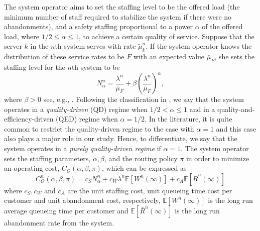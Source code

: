 \documentclass[a4paper,11pt,twoside]{article}
\numberwithin{equation}{section}
\numberwithin{figure}{section}
\theoremstyle{plain}
\newcommand{\EE}{\mathbb{E}}
\newcommand{\1}{\mathbbm{1}}
\begin{document}
The system operator aims to set the staffing level to be the offered load (the minimum number of staff required to stabilize the system if there were no abandonments), and a  safety staffing proportional to a power $\alpha$ of the offered load, where $1/2\leq \alpha\leq 1$, to achieve a certain quality of service. Suppose that the server $k$ in the $n$th system serves with rate $\tilde{\mu}_k^n$. If the system operator knows the distribution of these service rates to be $F$ with an expected value $\bar{\mu}_F$, she sets the staffing level for the $n$th system to be
\begin{equation}
    N_\alpha^n=\frac{\lambda^n}{\bar{\mu}_F}+\beta\left(\frac{\lambda^n}{\bar{\mu}_F}\right)^{\alpha},
    \label{eq:staffing_level}
\end{equation}
where $\beta>0$ see, e.g., \cite{Gans2003}. Following the classification in \cite{garnettetal02}, we say that the system operates in a \textit{quality-driven} (QD) regime when $1/2<\alpha\leq 1$ and in a quality-and-efficiency-driven (QED) regime when $\alpha=1/2$. In the literature, it is quite common to restrict the quality-driven regime to the case with $\alpha=1$ and this case also plays a major role in our study. Hence, to differentiate, we say that the system operates in a \emph{purely quality-driven regime} if $\alpha=1$. The system operator sets the staffing parameters, $\alpha,\beta$, and the routing policy $\pi$ in order to minimize an operating cost, $C_O(\alpha, \beta, \pi)$, which can be expressed as 
\begin{equation}\label{eq:operator_cost}
     C_O^n(\alpha, \beta, \pi) = c_SN_\alpha^n + c_W\lambda^n\EE[W^n(\infty)] + c_A\EE[\bar{R}^n(\infty)]
\end{equation}
where $c_S, c_W$  and $c_A$ are  the unit staffing cost, unit queueing time cost per customer and unit abandonment cost, respectively, $\EE[W^n(\infty)]$ is the long run average queueing time per customer and $\EE[\bar{R}^n(\infty)]$ is the long run abandonment rate from the system. 
\end{document}
